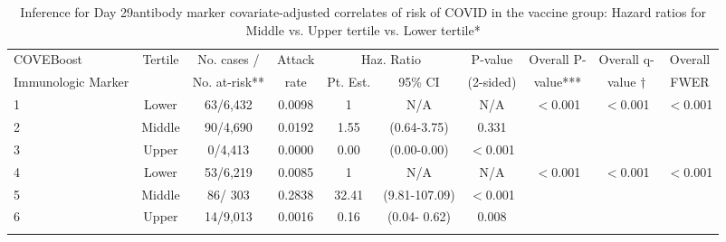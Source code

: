 \begin{longtable}{lccccccccc}
\caption{Inference for Day 29antibody marker covariate-adjusted correlates of risk of COVID in the vaccine group: Hazard ratios for Middle vs. Upper tertile vs. Lower tertile*} \\ 
   \hline
 
         \multicolumn{1}{l}{COVEBoost} & \multicolumn{1}{c}{Tertile}   & \multicolumn{1}{c}{No. cases /}   & \multicolumn{1}{c}{Attack}   & \multicolumn{2}{c}{Haz. Ratio}                     & \multicolumn{1}{c}{P-value}   & \multicolumn{1}{c}{Overall P-}      & \multicolumn{1}{c}{Overall q-}   & \multicolumn{1}{c}{Overall} \\ 
         \multicolumn{1}{l}{Immunologic Marker}            & \multicolumn{1}{c}{}          & \multicolumn{1}{c}{No. at-risk**} & \multicolumn{1}{c}{rate}   & \multicolumn{1}{c}{Pt. Est.} & \multicolumn{1}{c}{95\% CI} & \multicolumn{1}{c}{(2-sided)} & \multicolumn{1}{c}{value***} & \multicolumn{1}{c}{value $\dagger$} & \multicolumn{1}{c}{FWER} \\ 
         \hline
 
    1 & Lower & 63/6,432 & 0.0098 & 1 & N/A & N/A & $<$0.001 & $<$0.001 & $<$0.001 \\ 
  2 & Middle & 90/4,690 & 0.0192 & 1.55 & (0.64-3.75) & 0.331 &     &  &  \\ 
  3 & Upper & 0/4,413 & 0.0000 & 0.00 & (0.00-0.00) & $<$0.001 &     &  &  \\ 
  4 & Lower & 53/6,219 & 0.0085 & 1 & N/A & N/A & $<$0.001 & $<$0.001 & $<$0.001 \\ 
  5 & Middle & 86/  303 & 0.2838 & 32.41 & (9.81-107.09) & $<$0.001 &     &  &  \\ 
  6 & Upper & 14/9,013 & 0.0016 & 0.16 & (0.04-  0.62) & 0.008 &     &  &  \\ 
   \hline
\hline
\label{tab:CoR_univariable_svycoxph_cat_pretty}
\end{longtable}
